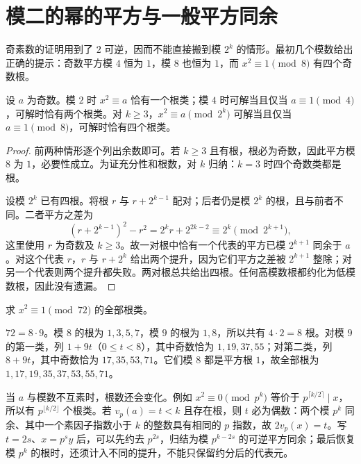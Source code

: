 \section{模二的幂的平方与一般平方同余}

奇素数的证明用到了 $2$ 可逆，因而不能直接搬到模 $2^k$ 的情形。最初几个模数给出正确的提示：奇数平方模 $4$ 恒为 $1$，模 $8$ 也恒为 $1$，而 $x^2\equiv1\pmod8$ 有四个奇数根。

\begin{proposition}
\label{prop:two-power-squares}
设 $a$ 为奇数。模 $2$ 时 $x^2\equiv a$ 恰有一个根类；模 $4$ 时可解当且仅当 $a\equiv1\pmod4$，可解时恰有两个根类。对 $k\ge3$，$x^2\equiv a\pmod{2^k}$ 可解当且仅当 $a\equiv1\pmod8$，可解时恰有四个根类。
\end{proposition}
\begin{proof}
前两种情形逐个列出余数即可。若 $k\ge3$ 且有根，根必为奇数，因此平方模 $8$ 为 $1$，必要性成立。为证充分性和根数，对 $k$ 归纳：$k=3$ 时四个奇数类都是根。

设模 $2^k$ 已有四根。将根 $r$ 与 $r+2^{k-1}$ 配对；后者仍是模 $2^k$ 的根，且与前者不同。二者平方之差为
\[
 (r+2^{k-1})^2-r^2=2^kr+2^{2k-2}\equiv2^k\pmod{2^{k+1}},
\]
这里使用 $r$ 为奇数及 $k\ge3$。故一对根中恰有一个代表的平方已模 $2^{k+1}$ 同余于 $a$。对这个代表 $r$，$r$ 与 $r+2^k$ 给出两个提升，因为它们平方之差被 $2^{k+1}$ 整除；对另一个代表则两个提升都失败。两对根总共给出四根。任何高模数根都约化为低模数根，因此没有遗漏。
\end{proof}

\begin{example}[把奇素数幂与二的幂合并]
求 $x^2\equiv1\pmod{72}$ 的全部根类。
\end{example}
\begin{solve}
$72=8\cdot9$。模 $8$ 的根为 $1,3,5,7$，模 $9$ 的根为 $1,8$，所以共有 $4\cdot2=8$ 根。对模 $9$ 的第一类，列 $1+9t$（$0\le t<8$），其中奇数恰为 $1,19,37,55$；对第二类，列 $8+9t$，其中奇数恰为 $17,35,53,71$。它们模 $8$ 都是平方根 $1$，故全部根为 $1,17,19,35,37,53,55,71$。
\end{solve}

当 $a$ 与模数不互素时，根数还会变化。例如 $x^2\equiv0\pmod{p^k}$ 等价于 $p^{\lceil k/2\rceil}\mid x$，所以有 $p^{\lfloor k/2\rfloor}$ 个根类。若 $v_p(a)=t<k$ 且存在根，则 $t$ 必为偶数：两个模 $p^k$ 同余、其中一个素因子指数小于 $k$ 的整数具有相同的 $p$ 指数，故 $2v_p(x)=t$。写 $t=2s$、$x=p^sy$ 后，可以先约去 $p^{2s}$，归结为模 $p^{k-2s}$ 的可逆平方同余；最后恢复模 $p^k$ 的根时，还须计入不同的提升，不能只保留约分后的代表元。

